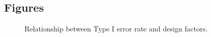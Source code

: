 \documentclass[twocolumn]{bmcart}%
\begin{document}
\begin{backmatter}

\section*{Figures}
  \begin{figure}[h!]
  \caption{Relationship between Type I error rate and design factors.}
      \end{figure}






\end{backmatter}
\end{document}
